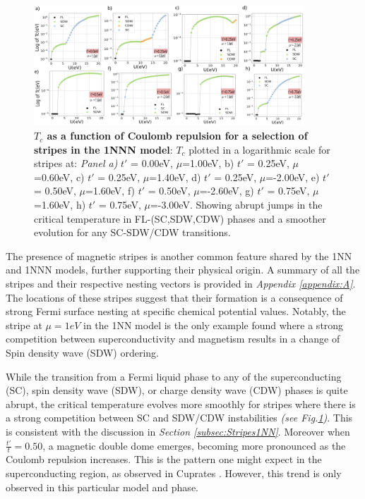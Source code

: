 \documentclass[11pt]{article}
\begin{document}
\begin{figure}[htbp]  %
    \centering
    \includegraphics[width=0.90\textwidth]{1NNNstripes.png}  %
    \caption{\textbf{$T_c$ as a function of Coulomb repulsion for a selection of stripes in the 1NNN model}: $T_c$ plotted in
    a logarithmic scale for stripes at:  \textit{Panel a)} $t'$ = 0.00eV, $\mu$=1.00eV, b) $t'$ = 0.25eV, $\mu$=0.60eV, c) $t'$ = 0.25eV, $\mu$=1.40eV,
    d) $t'$ = 0.25eV, $\mu$=-2.00eV,
    e) $t'$ = 0.50eV, $\mu$=1.60eV,
    f) $t'$ = 0.50eV, $\mu$=-2.60eV,
    g) $t'$ = 0.75eV, $\mu$=1.60eV, 
    h) $t'$ = 0.75eV, $\mu$=-3.00eV.
    Showing abrupt jumps in the critical temperature in FL-(SC,SDW,CDW) phases and a smoother
    evolution for any SC-SDW/CDW transitions.  }
    \label{fig:1NNNStripes}
\end{figure}

\noindent The presence of magnetic stripes is another common feature shared by the 1NN and 1NNN models, 
further supporting their physical origin.
A summary of all the stripes and their respective nesting vectors is provided 
in \textit{Appendix \ref{appendix:A}}. The locations of these
stripes suggest that their formation is a consequence of strong Fermi surface nesting at specific 
chemical potential values. 
Notably, the stripe at $\mu=1 eV$ in the 1NN model is the only example found where a strong 
competition between superconductivity and magnetism results in a change of Spin density wave (SDW) ordering.




\medskip 

\noindent While the transition from a Fermi liquid phase to any of the superconducting (SC), spin density wave (SDW), or charge density wave (CDW) phases is quite abrupt, the critical temperature
evolves more smoothly for stripes where there is a strong competition between SC and SDW/CDW instabilities \textit{(see Fig.\ref{fig:1NNNStripes})}. 
This is consistent with the discussion in \textit{Section \ref{subsec:Stripes1NN}}. Moreover when $\frac{t'}{t} = 0.50$, a magnetic double dome emerges, becoming more pronounced as the Coulomb repulsion increases. 
This is the pattern one might expect in the superconducting region, as observed in Cuprates \cite{taillefer2010scattering}. 
However, this trend is only observed in this particular model and phase.
\end{document}
